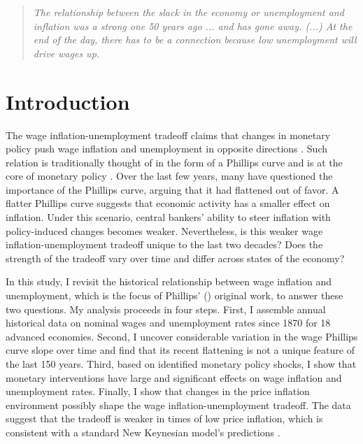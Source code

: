 \documentclass[12pt]{article}
\begin{document}
\clearpage

\begin{quote}
\textit{The relationship between the slack in the economy or unemployment and inflation was a strong one 50 years ago ... and has gone away. (...) At the end of the day, there has to be a connection because low unemployment will drive wages up.} \cite{Powell2019}
\end{quote}


\section{Introduction}
The wage inflation-unemployment tradeoff claims that changes in monetary policy push wage inflation and unemployment in opposite directions \citep{Mankiw2001}. Such relation is traditionally thought of in the form of a Phillips curve and is at the core of monetary policy \citep{Barnichon2019, Eser2020}. Over the last few years, many have questioned the importance of the Phillips curve, arguing that it had flattened out of favor. A flatter Phillips curve suggests that economic activity has a smaller effect on inflation. Under this scenario, central bankers' ability to steer inflation with policy-induced changes becomes weaker. Nevertheless, is this weaker wage inflation-unemployment tradeoff unique to the last two decades? Does the strength of the tradeoff vary over time and differ across states of the economy?



In this study, I revisit the historical relationship between wage inflation and unemployment, which is the focus of Phillips' (\citeyear{Phillips1958}) original work, to answer these two questions. My analysis proceeds in four steps. First, I assemble annual historical data on nominal wages and unemployment rates since 1870 for 18 advanced economies. Second, I uncover considerable variation in the wage Phillips curve slope over time and find that its recent flattening is not a unique feature of the last 150 years. Third, based on identified monetary policy shocks, I show that monetary interventions have large and significant effects on wage inflation and unemployment rates. Finally, I show that changes in the price inflation environment possibly shape the wage inflation-unemployment tradeoff. The data suggest that the tradeoff is weaker in times of low price inflation, which is consistent with a standard New Keynesian model's predictions \citep{Benati2007}.
\end{document}
